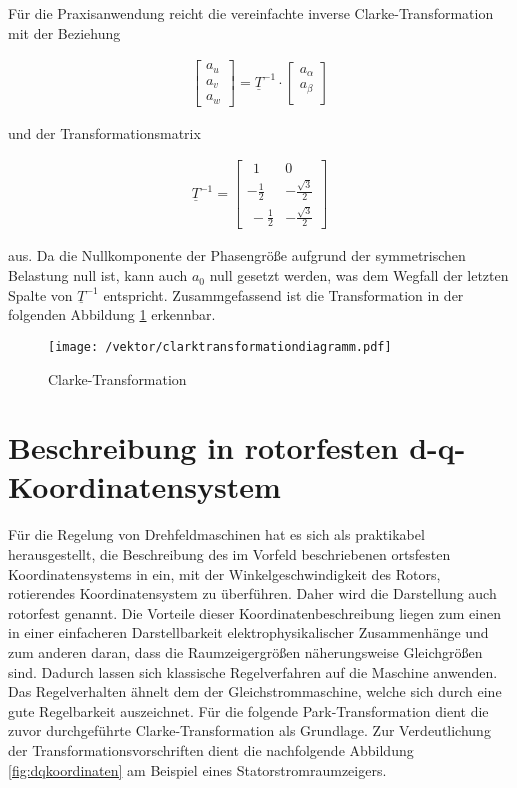 Für die Praxisanwendung reicht die vereinfachte inverse Clarke-Transformation mit der Beziehung

\begin{align}
	\begin{bmatrix}
		a_{u} \\
		a_{v} \\
		a_{w}
	\end{bmatrix}
	=\underline{T}^{-1}\cdot 
	\begin{bmatrix}
		a_{\alpha} \\
		a_{\beta} \\
	\end{bmatrix}
	\label{inverseclarkevektornulleinfach}
\end{align}
 
 und der Transformationsmatrix 
 
 \begin{align}
 	\underline{T}^{-1} =
 	\begin{bmatrix}
 		~~1 & 0   \\
 		-\frac{1}{2} & -\frac{\sqrt{3}}{2}  \\
 		~-\frac{1}{2} & -\frac{\sqrt{3}}{2} 
 	\end{bmatrix}
 	\label{inverseclarkematrixnulleinfach}
 \end{align}
 
 aus. 
 Da die Nullkomponente der Phasengröße aufgrund der symmetrischen Belastung null ist, kann auch $a_{0}$ null gesetzt werden, was dem Wegfall der letzten Spalte von ${\underline{T}^{-1}}$ entspricht. Zusammgefassend ist die Transformation in der folgenden Abbildung \ref{fig:clarktransformationdiagramm} erkennbar.
 
 \begin{figure}[h]
 	\centering
 	\texttt{[image: /vektor/clarktransformationdiagramm.pdf]}
 	\label{fig:clarktransformationdiagramm}
 	\caption{Clarke-Transformation}
 \end{figure}
 

\section{Beschreibung in rotorfesten d-q-Koordinatensystem}\label{sec:park}

Für die Regelung von Drehfeldmaschinen hat es sich als praktikabel herausgestellt, die Beschreibung des im Vorfeld beschriebenen ortsfesten Koordinatensystems in ein, mit der Winkelgeschwindigkeit des Rotors, rotierendes Koordinatensystem zu überführen. 
Daher wird die Darstellung auch rotorfest genannt. 
Die Vorteile dieser Koordinatenbeschreibung liegen zum einen in einer einfacheren Darstellbarkeit elektrophysikalischer Zusammenhänge und zum anderen daran, dass die Raumzeigergrößen näherungsweise Gleichgrößen sind.
Dadurch lassen sich klassische Regelverfahren auf die Maschine anwenden.
Das Regelverhalten ähnelt dem der Gleichstrommaschine, welche sich durch eine gute Regelbarkeit auszeichnet. 
Für die folgende Park-Transformation dient die zuvor durchgeführte Clarke-Transformation als Grundlage. 
Zur Verdeutlichung der Transformationsvorschriften dient die nachfolgende Abbildung \ref{fig:dqkoordinaten} am Beispiel eines Statorstromraumzeigers.

